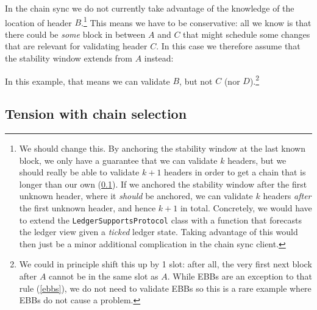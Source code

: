 In the chain sync we do not currently take advantage of the knowledge of the
location of header $B$.\footnote{\label{footnote:anchor-after-first-header}We
should change this. By anchoring the stability window at the last known block,
we only have a guarantee that we can validate $k$ headers, but we should really
be able to validate $k + 1$ headers in order to get a chain that is longer than
our own (\cref{low-density:tension}). If we anchored the stability window after
the first unknown header, where it \emph{should} be anchored, we can validate
$k$ headers \emph{after} the first unknown header, and hence $k + 1$ in total.
Concretely, we would have to extend the \lstinline!LedgerSupportsProtocol! class
with a function that forecasts the ledger view given a \emph{ticked} ledger
state. Taking advantage of this would then just be a minor additional
complication in the chain sync client.}  This means we have to be conservative:
all we know is that there could be \emph{some} block in between $A$ and $C$ that
might schedule some changes that are relevant for validating header $C$. In this
case we therefore assume that the stability window extends from $A$ instead:
%
\begin{center}
\end{center}
%
In this example, that means we can validate $B$, but not $C$ (nor
$D$).\footnote{We could in principle shift this up by 1 slot: after all, the
very first next block after $A$ cannot be in the same slot as $A$. While EBBs
are an exception to that rule (\cref{ebbs}), we do not need to validate EBBs so
this is a rare example where EBBs do not cause a problem.}

\subsection{Tension with chain selection}
\label{low-density:tension}

